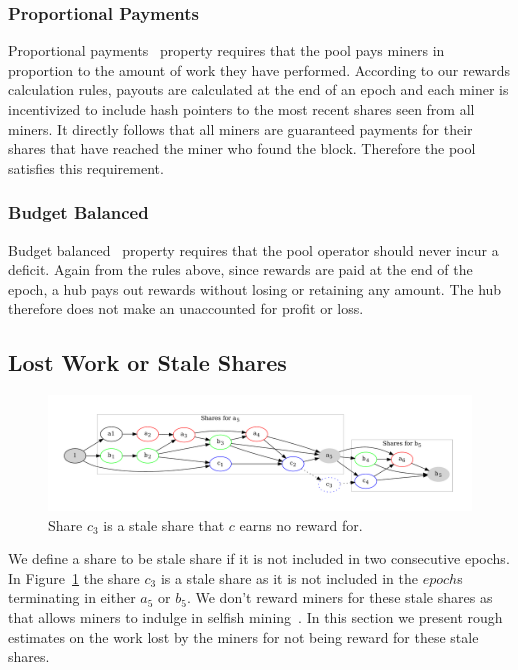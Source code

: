 \documentclass{article}
\begin{document}
\subsubsection{Proportional Payments}\label{sec:proportional-payments}

Proportional payments~\cite{incentives-compatible} property requires
that the pool pays miners in proportion to the amount of work they
have performed. According to our rewards calculation rules, payouts
are calculated at the end of an epoch and each miner is incentivized
to include hash pointers to the most recent shares seen from all
miners. It directly follows that all miners are guaranteed payments
for their shares that have reached the miner who found the
block. Therefore the pool satisfies this requirement.

\subsubsection{Budget Balanced}\label{sec:budget-balanced}

Budget balanced~\cite{incentives-compatible} property requires that
the pool operator should never incur a deficit. Again from the rules
above, since rewards are paid at the end of the epoch, a hub pays out
rewards without losing or retaining any amount. The hub therefore does
not make an unaccounted for profit or loss.

\subsection{Lost Work or Stale Shares}\label{ref:stales}

\begin{figure}
  \begin{center}
    \includegraphics[width=1\textwidth]{shares-propagation.pdf}
    \caption{Share $c_3$ is a stale share that $c$ earns no reward
      for.}\label{fig:shares-propagation}
  \end{center}
\end{figure}

We define a share to be stale share if it is not included in two
consecutive epochs. In Figure~\ref{fig:shares-propagation} the share
$c_3$ is a stale share as it is not included in the $epoch$s
terminating in either $a_5$ or $b_5$. We don't reward miners for these
stale shares as that allows miners to indulge in selfish
mining~\cite{majority-is-not-enough}. In this section we present rough
estimates on the work lost by the miners for not being reward for
these stale shares.
\end{document}
